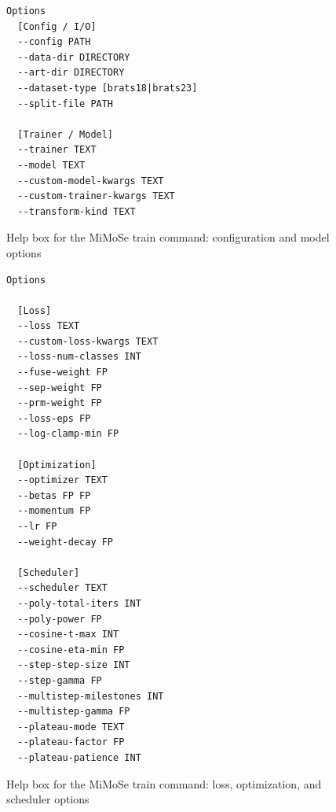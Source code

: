 \documentclass{article}
\begin{document}
\begin{figure}[h]
\centering
\begin{tcolorbox}[
  colback=lightgreenbg,
  colframe=lightgreenframe,
  arc=2mm,
  boxrule=0.6pt,
  title=MiMoSe train: config and model,
  fonttitle=\bfseries
]
\begin{Verbatim}[breaklines=true,breakanywhere=true,fontsize=\small]
Options
  [Config / I/O]
  --config PATH
  --data-dir DIRECTORY
  --art-dir DIRECTORY
  --dataset-type [brats18|brats23]
  --split-file PATH

  [Trainer / Model]
  --trainer TEXT
  --model TEXT
  --custom-model-kwargs TEXT
  --custom-trainer-kwargs TEXT
  --transform-kind TEXT
\end{Verbatim}
\end{tcolorbox}
\caption{Help box for the MiMoSe train command: configuration and model options}
\label{fig:mimose_train_config_model}
\end{figure}

\begin{figure}[h]
\centering
\begin{tcolorbox}[
  colback=lightgreenbg,
  colframe=lightgreenframe,
  arc=2mm,
  boxrule=0.6pt,
  title=MiMoSe train: loss and optimization,
  fonttitle=\bfseries
]
\begin{Verbatim}[breaklines=true,breakanywhere=true,fontsize=\small]
Options

  [Loss]
  --loss TEXT
  --custom-loss-kwargs TEXT
  --loss-num-classes INT
  --fuse-weight FP
  --sep-weight FP
  --prm-weight FP
  --loss-eps FP
  --log-clamp-min FP

  [Optimization]
  --optimizer TEXT
  --betas FP FP
  --momentum FP
  --lr FP
  --weight-decay FP

  [Scheduler]
  --scheduler TEXT
  --poly-total-iters INT
  --poly-power FP
  --cosine-t-max INT
  --cosine-eta-min FP
  --step-step-size INT
  --step-gamma FP
  --multistep-milestones INT
  --multistep-gamma FP
  --plateau-mode TEXT
  --plateau-factor FP
  --plateau-patience INT
\end{Verbatim}
\end{tcolorbox}
\caption{Help box for the MiMoSe train command: loss, optimization, and scheduler options}
\label{fig:mimose_train_optimization}
\end{figure}
\end{document}
